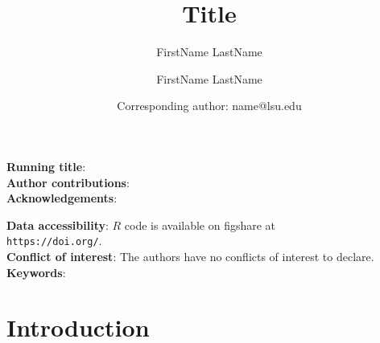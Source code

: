 \documentclass[12pt]{dallasLab}
\title{Title}
\author[a,*]{FirstName LastName}
\author[b]{FirstName LastName}
\affil[a]{Place 1}
\affil[b]{Place 2}
\date{ \small *Corresponding author: name@lsu.edu}
\begin{document}
\maketitle



\clearpage 
{}

\noindent \textbf{Running title}:  \\

\noindent \textbf{Author contributions}:  \\

\noindent \textbf{Acknowledgements}:

\noindent \textbf{Data accessibility}: $R$ code is available on figshare at \\\texttt{https://doi.org/}. \\

\noindent \textbf{Conflict of interest}: The authors have no conflicts of interest to declare.\\

\noindent \textbf{Keywords}:  \\





\clearpage
{}

\section*{Introduction}

\linenumbers



\paragraph*{}





\paragraph*{}




\paragraph*{}
\end{document}
